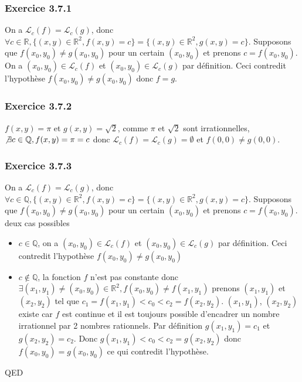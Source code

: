 \documentclass[]{book}
\theoremstyle{definition}
\newcommand{\bb}[1]{\mathbb{#1}}
\newcommand{\Q}{\bb{Q}}
\newcommand{\R}{\bb{R}}
\begin{document}
\subsubsection*{Exercice 3.7.1}
On a $\mathscr{L}_c(f)= \mathscr{L}_c(g)$, donc $\forall c \in \R, \{(x,y) \in \R^2, f(x,y) = c\} = \{(x,y) \in \R^2, g(x,y) = c\}$. Supposons que $f(x_0,y_0) \neq g(x_0,y_0)$ pour un certain $(x_0,y_0)$ et prenons $c=f(x_0,y_0)$. On a $(x_0,y_0) \in \mathscr{L}_c(f)$ et $(x_0,y_0) \in \mathscr{L}_c(g)$ par d\'efinition. Ceci contredit l'hypoth\`ese $f(x_0,y_0) \neq g(x_0,y_0)$ donc $f=g$.   

\subsubsection*{Exercice 3.7.2}
$f(x,y) = \pi$ et $g(x,y) = \sqrt{2}$, comme $\pi$ et $\sqrt{2}$ sont irrationnelles, $\not \exists c \in \Q, f(x,y) = \pi = c$ donc $\mathscr{L}_c(f) = \mathscr{L}_c(g) = \emptyset$ et $f(0,0) \neq g(0,0)$.

\subsubsection*{Exercice 3.7.3}
On a $\mathscr{L}_c(f)= \mathscr{L}_c(g)$, donc $\forall c \in \Q, \{(x,y) \in \R^2, f(x,y) = c\} = \{(x,y) \in \R^2, g(x,y) = c\}$. Supposons que $f(x_0,y_0) \neq g(x_0,y_0)$ pour un certain $(x_0,y_0)$ et prenons $c=f(x_0,y_0)$. deux cas possibles 
\begin{itemize}
\item $c \in \Q$, on a $(x_0,y_0) \in \mathscr{L}_c(f)$ et $(x_0,y_0) \in \mathscr{L}_c(g)$ par d\'efinition. Ceci contredit l'hypoth\`ese $f(x_0,y_0) \neq g(x_0,y_0)$
\item $c \not \in \Q$, la fonction $f$ n'est pas constante donc $\exists (x_1,y_1) \neq (x_0, y_0) \in \R^2, f(x_0, y_0) \neq f(x_1, y_1)$ prenons $(x_1,y_1)$ et $(x_2,y_2)$ tel que $c_1=f(x_1,y_1) < c_0 < c_2=f(x_2, y_2)$. $(x_1, y_1)$, $(x_2, y_2)$ existe car $f$ est continue et il est toujours possible d'encadrer un nombre irrationnel par 2 nombres rationnels. Par d\'efinition $g(x_1, y_1) = c_1$ et  $g(x_2, y_2) = c_2$. Donc $g(x_1,y_1) < c_0 < c_2=g(x_2, y_2)$ donc $f(x_0,y_0) = g(x_0, y_0)$ ce qui contredit l'hypoth\`ese.
\end{itemize}   



QED
\end{document}
